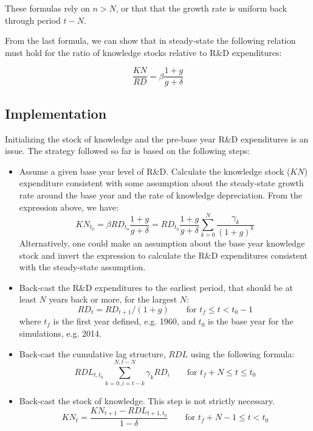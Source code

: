 \documentclass[11pt,letterpaper]{report}
\begin{document}
These formulas rely on $n > N$, or that that the growth rate is uniform back through period $t-N$.

From the last formula, we can show that in steady-state the following
relation must hold for the ratio of knowledge stocks relative to R\&D expenditures:

\[
\frac{\mathit{KN}} {\mathit{RD}} = \beta \frac{1+g}{g+\delta}
\]

\subsection*{Implementation}

Initializing the stock of knowledge and the pre-base year R\&D expenditures
is an issue. The strategy followed so far is based on the following steps:

\begin{itemize}
	\item {Assume a given base year level of R\&D. Calculate
		the knowledge stock ($\mathit{KN}$) expenditure consistent with some assumption about the steady-state
		growth rate around the base year and the rate of knowledge depreciation.
		From the expression above, we have:
		\[{\mathit{KN}_{t_0}} = {\beta}  {\mathit{RD}_{t_0}}\frac{1+g}{g+\delta} =
		{\mathit{RD}_{t_0}} \frac{1+g}{g+\delta}\displaystyle \sum_{k=0}^N{ \frac{\gamma_{k}}{\left(1+g\right)^k} }
		\] Alternatively, one could make an assumption about the base
		year knowledge stock and invert the expression to calculate the
		R\&D expenditures consistent with the steady-state assumption.}
	\item {Back-cast the R\&D expenditures to the earliest period, that
		should be at least $N$ years back or more, for the largest $N$:
		\[
		\mathit{RD}_t = \mathit{RD}_{t+1} / \left(1+g\right) \qquad
		\textrm{for } t_f \le t < t_0-1
		\]
		where $t_f$ is the first year defined, e.g. 1960, and
		$t_0$ is the base year for the simulations, e.g. 2014.}
	\item {Back-cast the cumulative lag structure, $\mathit{RDL}$ using the following formula:
		\[
		\mathit{RDL}_{t,t_0}
		\sum_{k=0, i=t-k}^{N,t-N}{\gamma_{k}\mathit{RD}_i}
		\qquad \textrm{for } t_f+N \le t \le t_0
		\]}
	\item {Back-cast the stock of knowledge. This step is
		not strictly necessary.
		\[
		\mathit{KN}_t = \frac{\mathit{KN}_{t+1} - \mathit{RDL}_{t+1,t_0}}
		{1-\delta} \qquad \textrm{for } t_f+N-1 \le t < t_0
		\]}
	
\end{itemize}
\end{document}
